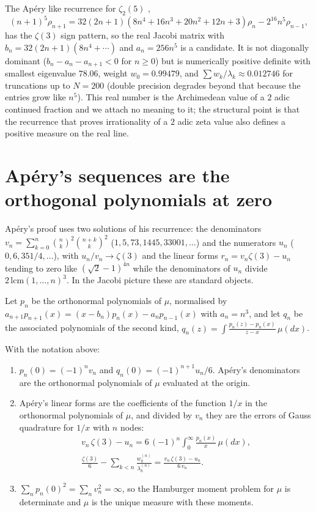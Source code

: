 \begin{remark}
The Ap\'ery like recurrence for $\zeta_2(5)$ \cite{laisprangzudilin2025},
\[
(n+1)^5\rho_{n+1}=32(2n+1)(8n^4+16n^3+20n^2+12n+3)\rho_n-2^{16}n^5\rho_{n-1},
\]
has the $\zeta(3)$ sign pattern, so the real Jacobi matrix with $b_n=32(2n+1)(8n^4+\cdots)$ and $a_n=256n^5$ is a candidate. It is not diagonally dominant ($b_n-a_n-a_{n+1}<0$ for $n\ge0$) but is numerically positive definite with smallest eigenvalue $78.06$, weight $w_0=0.99479$, and $\sum w_k/\lambda_k\approx0.012746$ for truncations up to $N=200$ (double precision degrades beyond that because the entries grow like $n^5$). This real number is the Archimedean value of a $2$ adic continued fraction and we attach no meaning to it; the structural point is that the recurrence that proves irrationality of a $2$ adic zeta value also defines a positive measure on the real line.
\end{remark}

\section{Ap\'ery's sequences are the orthogonal polynomials at zero}

Ap\'ery's proof uses two solutions of his recurrence: the denominators $v_n=\sum_{k=0}^n\binom nk^2\binom{n+k}k^2$ ($1,5,73,1445,33001,\dots$) and the numerators $u_n$ ($0,6,351/4,\dots$), with $u_n/v_n\to\zeta(3)$ and the linear forms $r_n=v_n\zeta(3)-u_n$ tending to zero like $(\sqrt2-1)^{4n}$ while the denominators of $u_n$ divide $2\,\mathrm{lcm}(1,\dots,n)^3$. In the Jacobi picture these are standard objects.

Let $p_n$ be the orthonormal polynomials of $\mu$, normalised by $a_{n+1}p_{n+1}(x)=(x-b_n)p_n(x)-a_np_{n-1}(x)$ with $a_n=n^3$, and let $q_n$ be the associated polynomials of the second kind, $q_n(z)=\int\frac{p_n(z)-p_n(x)}{z-x}\,\mu(dx)$.

\begin{theorem}\label{thm:zvseq}
With the notation above:
\begin{enumerate}
\item $p_n(0)=(-1)^nv_n$ and $q_n(0)=(-1)^{n+1}u_n/6$. Ap\'ery's denominators are the orthonormal polynomials of $\mu$ evaluated at the origin.
\item Ap\'ery's linear forms are the coefficients of the function $1/x$ in the orthonormal polynomials of $\mu$, and divided by $v_n$ they are the errors of Gauss quadrature for $1/x$ with $n$ nodes:
\begin{gather*}
v_n\,\zeta(3)-u_n=6\,(-1)^n\int_0^\infty\frac{p_n(x)}{x}\,\mu(dx),\\
\frac{\zeta(3)}6-\sum_{k<n}\frac{w_k^{(n)}}{\lambda_k^{(n)}}=\frac{v_n\,\zeta(3)-u_n}{6\,v_n}.
\end{gather*}
\item $\sum_n p_n(0)^2=\sum_n v_n^2=\infty$, so the Hamburger moment problem for $\mu$ is determinate and $\mu$ is the unique measure with these moments.
\end{enumerate}
\end{theorem}

